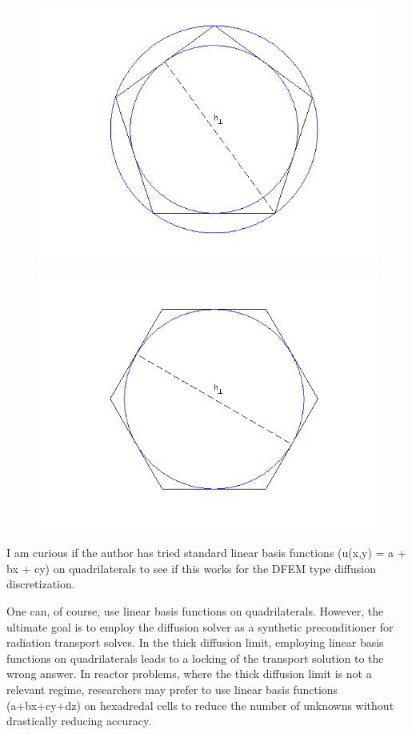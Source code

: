 \documentclass{article}
\begin{document}
\begin{figure}[H]
\centering
\includegraphics[scale=0.75]{hperp_odd.png}
\end{figure}
\begin{figure}[H]
\centering
\includegraphics[scale=0.75]{hperp_even.png}
\end{figure}


\bigskip


{
\color{blue}
I am curious if the author has tried standard linear basis functions (u(x,y) = a + bx + cy) on
quadrilaterals to see if this works for the DFEM type diffusion discretization.
}

One can, of course, use linear basis functions on quadrilaterals. However, the ultimate goal is to employ
the diffusion solver as a synthetic preconditioner for radiation transport solves. In the thick diffusion limit,
employing linear basis functions on quadrilaterals leads to a locking of the transport solution to the 
wrong answer. In reactor problems, where the thick diffusion limit is not a relevant regime, researchers
may prefer to use linear basis functions (a+bx+cy+dz) on hexadredal cells to reduce the number of unknowns
without drastically reducing accuracy.
\end{document}
